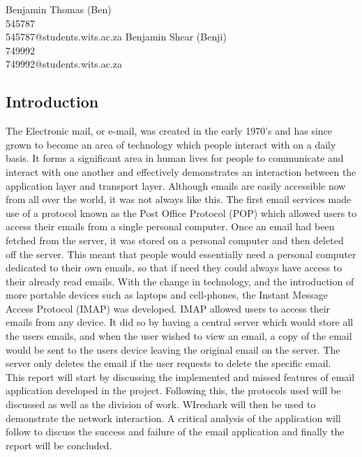 \documentclass[11pt]{article}
\begin{document}
\begin{center}
{\Huge Benjamin Thomas (Ben)} \\
{\Large 545787} \\
{\large 545787@students.wits.ac.za}
\break{}
\break{}
{\Huge Benjamin Shear (Benji)} \\
{\Large 749992} \\
{\large 749992@students.wits.ac.za}
\end{center}
\vspace{5cm}
\begin{abstract}
\justify
    
\end{abstract}
\newpage
\begin{multicols}{2}
\section{Introduction}
The Electronic mail, or e-mail, was created in the early 1970's and has since grown to become an area of technology which people interact with on a daily basis. It forms a significant area in human lives for people to communicate and interact with one another and effectively demonstrates an interaction between the application layer and transport layer. Although emails are easily accessible now from all over the world, it was not always like this. The first email services made use of a protocol known as the Post Office Protocol (POP) which allowed users to access their emails from a single personal computer. Once an email had been fetched from the server, it was stored on a personal computer and then deleted off the server. This meant that people would essentially need a personal computer dedicated to their own emails, so that if need they could always have access to their already read emails. With the change in technology, and the introduction of more portable devices such as laptops and cell-phones, the Instant Message Access Protocol (IMAP) was developed. IMAP allowed users to access their emails from any device. It did so by having a central server which would store all the users emails, and when the user wished to view an email, a copy of the email would be sent to the users device leaving the original email on the server. The server only deletes the email if the user requests to delete the specific email.\\
This report will start by discussing the implemented and missed features of email application developed in the project. Following this, the protocols used will be discussed as well as the division of work. WIreshark will then be used to demonstrate the network interaction. A critical analysis of the application will follow to discuss the success and failure of the email application and finally the report will be concluded. 

\end{multicols}
\end{document}
